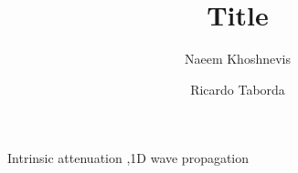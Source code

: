 \documentclass[a4paper,review]{elsarticle}
\begin{document}
\begin{frontmatter}

\title{Title}

\author[label1]{Naeem Khoshnevis}
\author[label1,label2]{Ricardo Taborda}

\address[label1]{Center for Earthquake Research and Information, University of Memphis, 3890 Central Ave., Memphis TN 38152, USA}
\address[label2]{Department of Civil Engineering, University of Memphis, 3890 Central Ave., Memphis TN 38152, USA}



\begin{keyword}
Intrinsic attenuation \sep 1D wave propagation 


\end{keyword}

\end{frontmatter}










\end{document}
